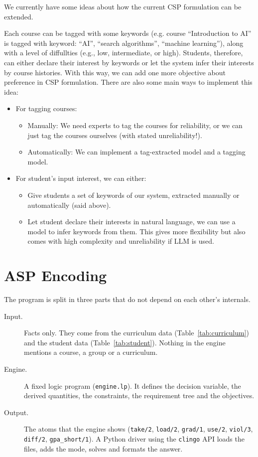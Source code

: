 \documentclass[10pt,a4paper]{article}
\begin{document}
We currently have some ideas about how the current CSP formulation can be extended. 

Each course can be tagged with some keywords (e.g. course ``Introduction to AI'' is tagged with keyword: ``AI'', ``search algorithms'', ``machine learning''), along with a level of diffullties (e.g., low, intermediate, or high). Students, therefore, can either declare their interest by keywords or let the system infer their interests by course histories. With this way, we can add one more objective about preference in CSP formulation. There are also some main ways to implement this idea:
\begin{itemize}
      \item For tagging courses:
            \begin{itemize}
                  \item Manually: We need experts to tag the courses for reliability, or we can just tag the courses ourselves (with stated unreliability!).
                  \item Automatically: We can implement a tag-extracted model and a tagging model.
            \end{itemize}
      \item For student's input interest, we can either:
      \begin{itemize}
            \item Give students a set of keywords of our system, extracted manually or automatically (said above).
            \item Let student declare their interests in natural language, we can use a model to infer keywords from them. This gives more flexibility but also comes with high complexity and unreliability if LLM is used.
      \end{itemize}
\end{itemize}



\section{ASP Encoding}\label{sec:encoding}
 
The program is split in three parts that do not depend on each other's
internals.
\begin{description}
  \item[Input.] Facts only. They come from the curriculum data
        (Table~\ref{tab:curriculum}) and the student data
        (Table~\ref{tab:student}). Nothing in the engine mentions a course,
        a group or a curriculum.
  \item[Engine.] A fixed logic program (\texttt{engine.lp}). It defines the
        decision variable, the derived quantities, the constraints, the
        requirement tree and the objectives.
  \item[Output.] The atoms that the engine shows (\texttt{take/2},
        \texttt{load/2}, \texttt{grad/1}, \texttt{use/2}, \texttt{viol/3},
        \texttt{diff/2}, \texttt{gpa\_short/1}). A Python driver using the
        \texttt{clingo} API loads the files, adds the mode, solves and
        formats the answer.
\end{description}
 
\end{document}
